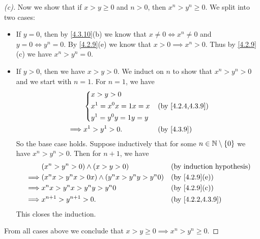 \begin{proof}[(c)]
  Now we show that if \(x > y \geq 0\) and \(n > 0\), then \(x^n > y^n \geq 0\).
  We split into two cases:
  \begin{itemize}
    \item If \(y = 0\), then by \cref{4.3.10}(b) we know that \(x \neq 0 \iff x^n \neq 0\) and \(y = 0 \iff y^n = 0\).
          By \cref{4.2.9}(e) we know that \(x > 0 \implies x^n > 0\).
          Thus by \cref{4.2.9}(c) we have \(x^n > y^n = 0\).
    \item If \(y > 0\), then we have \(x > y > 0\).
          We induct on \(n\) to show that \(x^n > y^n > 0\) and we start with \(n = 1\).
          For \(n = 1\), we have
          \begin{align*}
                     & \begin{dcases}
                         x > y > 0            \\
                         x^1 = x^0 x = 1x = x \\
                         y^1 = y^0 y = 1y = y
                       \end{dcases} &  & \by{4.2.4,4.3.9}      \\
            \implies & x^1 > y^1 > 0.          &  & \by{4.3.9}
          \end{align*}
          So the base case holds.
          Suppose inductively that for some \(n \in \mathbb{N} \setminus \left\lbrace0\right\rbrace\) we have \(x^n > y^n > 0\).
          Then for \(n + 1\), we have
          \begin{align*}
                     & (x^n > y^n > 0) \land (x > y > 0)                  &  & \byIH            \\
            \implies & (x^n x > y^n x > 0x) \land (y^n x > y^n y > y^n 0) &  & \by{4.2.9}[e]    \\
            \implies & x^n x > y^n x > y^n y > y^n 0                      &  & \by{4.2.9}[c]    \\
            \implies & x^{n + 1} > y^{n + 1} > 0.                         &  & \by{4.2.2,4.3.9}
          \end{align*}
          This closes the induction.
  \end{itemize}
  From all cases above we conclude that \(x > y \geq 0 \implies x^n > y^n \geq 0\).
\end{proof}

